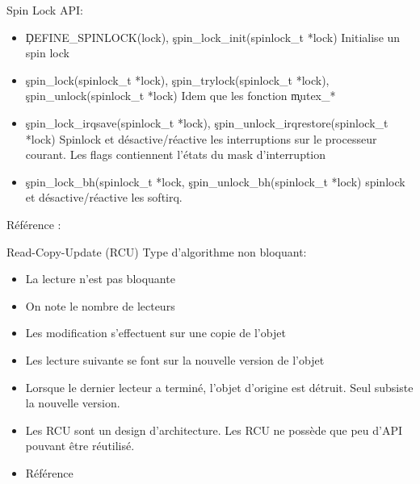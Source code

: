 \begin{frame}[fragile=singleslide]{Spin Lock}
  API:
  \begin{itemize}
  \item                                      \c{DEFINE_SPINLOCK(lock)},
    \c{spin_lock_init(spinlock_t *lock)} Initialise un spin lock
  \item                \c{spin_lock(spinlock_t                *lock)},
    \c{spin_trylock(spinlock_t                                 *lock)},
    \c{spin_unlock(spinlock_t   *lock)}    Idem   que   les   fonction
    \c{mutex_*}
  \item            \c{spin_lock_irqsave(spinlock_t            *lock)},
    \c{spin_unlock_irqrestore(spinlock_t     *lock)}    Spinlock    et
    désactive/réactive    les   interruptions   sur    le   processeur
    courant. Les flags contiennent l'états du mask d'interruption
  \item               \c{spin_lock_bh(spinlock_t               *lock},
    \c{spin_unlock_bh(spinlock_t       *lock)}       spinlock       et
    désactive/réactive les softirq.
  \end{itemize}
  Référence :  
\end{frame}


\begin{frame}[fragile=singleslide]{Read-Copy-Update (RCU)}
  Type d'algorithme non bloquant:
  \begin{itemize} 
  \item La lecture n'est pas bloquante
  \item On note le nombre de lecteurs
  \item Les modification s'effectuent sur une copie de l'objet
  \item Les lecture suivante se font sur la nouvelle version de l'objet
  \item Lorsque  le dernier lecteur  a terminé, l'objet  d'origine est
    détruit. Seul subsiste la nouvelle version.
  \item  Les RCU sont un design d'architecture. Les RCU ne possède que peu d'API pouvant être réutilisé.
  \item Référence   
  \end{itemize} 
\end{frame}

